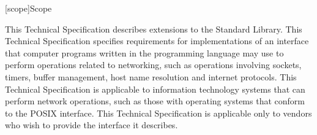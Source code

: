 
[scope]{Scope}

\pnum
 This Technical Specification describes extensions to the \Cpp Standard Library. This Technical Specification specifies requirements for implementations of an interface that computer programs written in the \Cpp programming language may use to perform operations related to networking, such as operations involving sockets, timers, buffer management, host name resolution and internet protocols. This Technical Specification is applicable to information technology systems that can perform network operations, such as those with operating systems that conform to the POSIX interface. This Technical Specification is applicable only to vendors who wish to provide the interface it describes.


%


